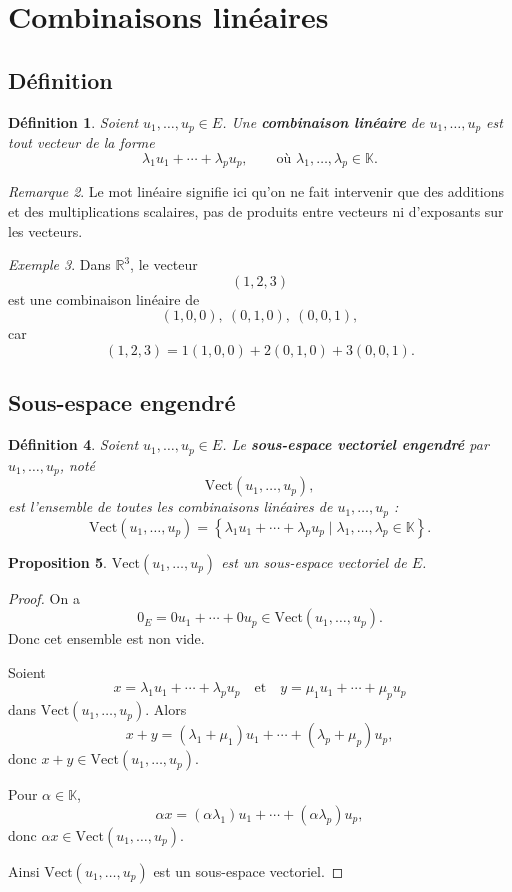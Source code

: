 \documentclass[11pt,a4paper]{article}
\newtheorem{definition}{Définition}[section]
\newtheorem{proposition}[definition]{Proposition}
\theoremstyle{remark}
\newtheorem{remarque}[definition]{Remarque}
\newtheorem{exemple}[definition]{Exemple}
\newcommand{\R}{\mathbb{R}}
\newcommand{\K}{\mathbb{K}}
\begin{document}
\section{Combinaisons linéaires}

\subsection{Définition}

\begin{definition}
Soient \(u_1,\dots,u_p\in E\).  
Une \textbf{combinaison linéaire} de \(u_1,\dots,u_p\) est tout vecteur de la forme
\[
\lambda_1u_1+\cdots+\lambda_pu_p,
\qquad
\text{où } \lambda_1,\dots,\lambda_p\in\K.
\]
\end{definition}

\begin{remarque}
Le mot \og linéaire \fg{} signifie ici qu’on ne fait intervenir que des additions et des multiplications scalaires, pas de produits entre vecteurs ni d’exposants sur les vecteurs.
\end{remarque}

\begin{exemple}
Dans \(\R^3\), le vecteur
\[
(1,2,3)
\]
est une combinaison linéaire de
\[
(1,0,0),\ (0,1,0),\ (0,0,1),
\]
car
\[
(1,2,3)=1(1,0,0)+2(0,1,0)+3(0,0,1).
\]
\end{exemple}

\subsection{Sous-espace engendré}

\begin{definition}
Soient \(u_1,\dots,u_p\in E\).  
Le \textbf{sous-espace vectoriel engendré} par \(u_1,\dots,u_p\), noté
\[
\mathrm{Vect}(u_1,\dots,u_p),
\]
est l’ensemble de toutes les combinaisons linéaires de \(u_1,\dots,u_p\) :
\[
\mathrm{Vect}(u_1,\dots,u_p)=
\left\{
\lambda_1u_1+\cdots+\lambda_pu_p
\mid
\lambda_1,\dots,\lambda_p\in\K
\right\}.
\]
\end{definition}

\begin{proposition}
\(\mathrm{Vect}(u_1,\dots,u_p)\) est un sous-espace vectoriel de \(E\).
\end{proposition}

\begin{proof}
On a
\[
0_E=0u_1+\cdots+0u_p\in \mathrm{Vect}(u_1,\dots,u_p).
\]
Donc cet ensemble est non vide.

Soient
\[
x=\lambda_1u_1+\cdots+\lambda_pu_p
\quad \text{et} \quad
y=\mu_1u_1+\cdots+\mu_pu_p
\]
dans \(\mathrm{Vect}(u_1,\dots,u_p)\). Alors
\[
x+y=(\lambda_1+\mu_1)u_1+\cdots+(\lambda_p+\mu_p)u_p,
\]
donc \(x+y\in \mathrm{Vect}(u_1,\dots,u_p)\).

Pour \(\alpha\in\K\),
\[
\alpha x=(\alpha\lambda_1)u_1+\cdots+(\alpha\lambda_p)u_p,
\]
donc \(\alpha x\in \mathrm{Vect}(u_1,\dots,u_p)\).

Ainsi \(\mathrm{Vect}(u_1,\dots,u_p)\) est un sous-espace vectoriel.
\end{proof}
\end{document}
